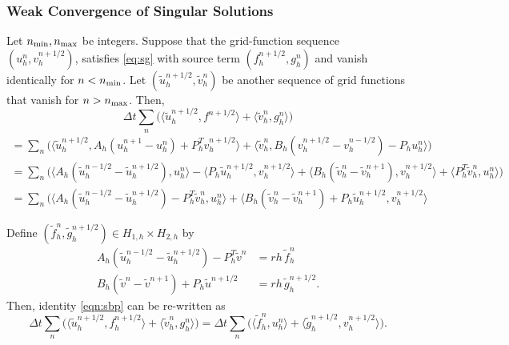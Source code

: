  
\subsubsection{Weak Convergence of Singular Solutions}

Let $n_{\rm min}, n_{\rm max}$ be integers.
Suppose that the grid-function sequence $(u_h^n,v_h^{n+1/2})$, 
satisfies \ref{eq:sg} with source term $(f_h^{n+1/2},g_h^{n})$
and vanish identically for $n<n_{\rm min}$.
Let $(\tilde u_h^{n+1/2},\tilde v_h^{n})$ be another sequence of 
grid functions that vanish for $n>n_{\rm max}$. 
Then,
\[
	\Delta t \sum_{n} \Big( \langle \tilde u_h^{n+1/2}, f^{n+1/2}\rangle +
					   \langle \tilde v_h^n, g_h^n \rangle \Big)
\]
\begin{equation*}
\begin{split}
	= \sum_n \Big( \langle \tilde u_h^{n+1/2}, 
					A_h( u_h^{n+1} - u_h^n) + P_h^T v_h^{n+1/2} \rangle 
			  +  \langle \tilde v_h^n, 
					B_h ( v_h^{n+1/2}-v_h^{n-1/2} ) - P_h u_h^n \rangle \Big)
\end{split}
\end{equation*}
\begin{equation*}
\begin{split}
	= \sum_n \Big( \langle A_h ( \tilde u_h^{n-1/2}-\tilde u_h^{n+1/2} ), u_h^n \rangle 
			       -\langle P_h \tilde u_h^{n+1/2}, v_h^{n+1/2}\rangle 
	 		       +\langle B_h ( \tilde v_h^{n} - \tilde v_h^{n+1} ), v_h^{n+1/2} \rangle
			       +\langle P_h^T \tilde v_h^n, u_h^n\rangle \Big)
\end{split}
\end{equation*}
\begin{equation}\label{eqn:sbp}
\begin{split}
	= \sum_n \Big( \langle A_h (\tilde u_h^{n-1/2} - \tilde u_h^{n+1/2}) - P_h^T \tilde v_h^n, 
				u_h^n\rangle 
	                      +	\langle B_h (\tilde v_h^{n} - \tilde v_h^{n+1}) + P_h \tilde u_h^{n+1/2},
	                      	v_h^{n+1/2}\rangle
\end{split}
\end{equation}

Define $(\tilde f_h^{n},\tilde g_h^{n+1/2})\in H_{1,h}\times H_{2,h}$ by
\begin{equation}\label{eqn:inadj}
\begin{split}
	A_h( \tilde u_h^{n-1/2}-\tilde u_h^{n+1/2} ) - P_h^T \tilde v^n & =  rh\, \tilde f_h^{n} \\
	B_h( \tilde v^{n} - \tilde v^{n+1} ) + P_h \tilde u^{n+1/2} &=  rh \, \tilde g_h^{n+1/2}.
\end{split}
\end{equation}
Then, identity \ref{eqn:sbp} can be re-written as
\begin{equation}
\label{eqn:weak}
	\Delta t \sum_{n} \Big( \langle \tilde u_h^{n+1/2}, f_h^{n+1/2} \rangle +
	 			 	  \langle \tilde v_h^n, g_h^n \rangle \Big)
	= \Delta t \sum_{n} \Big( \langle \tilde f_h^n, u_h^n \rangle + 
					     \langle \tilde g_h^{n+1/2}, v_h^{n+1/2}\rangle \Big).
\end{equation}

